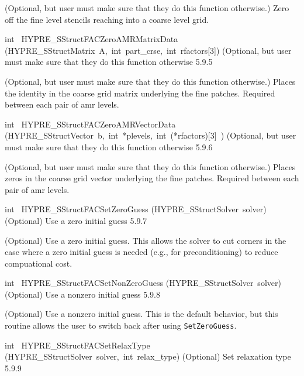 \documentclass{article}
\begin{document}
\begin{cxxentry}
\begin{cxxentry}
\begin{cxxfunction}
\begin{cxxdoc}
(Optional, but user must make sure that they do this function otherwise.)
Zero off the fine level stencils reaching into a coarse level grid.
\end{cxxdoc}
\end{cxxfunction}
\begin{cxxfunction}
{int\ }
        {HYPRE\_SStructFACZeroAMRMatrixData}
        {(HYPRE\_SStructMatrix\ A,\ int\ part\_crse,\ int\ rfactors[3])}
        {
(Optional, but user must make sure that they do this function otherwise}
        {5.9.5}
\begin{cxxdoc}

(Optional, but user must make sure that they do this function otherwise.)
Places the identity in the coarse grid matrix underlying the fine patches.
Required between each pair of amr levels.
\end{cxxdoc}
\end{cxxfunction}
\begin{cxxfunction}
{int\ }
        {HYPRE\_SStructFACZeroAMRVectorData}
        {(HYPRE\_SStructVector\ b,\ int\ *plevels,\ int\ (*rfactors)[3]\ )}
        {
(Optional, but user must make sure that they do this function otherwise}
        {5.9.6}
\begin{cxxdoc}

(Optional, but user must make sure that they do this function otherwise.)
Places zeros in the coarse grid vector underlying the fine patches.
Required between each pair of amr levels.
\end{cxxdoc}
\end{cxxfunction}
\begin{cxxfunction}
{int\ }
        {HYPRE\_SStructFACSetZeroGuess}
        {(HYPRE\_SStructSolver\ solver)}
        {
(Optional) Use a zero initial guess}
        {5.9.7}
\begin{cxxdoc}

(Optional) Use a zero initial guess.  This allows the solver to cut corners
in the case where a zero initial guess is needed (e.g., for preconditioning)
to reduce compuational cost.
\end{cxxdoc}
\end{cxxfunction}
\begin{cxxfunction}
{int\ }
        {HYPRE\_SStructFACSetNonZeroGuess}
        {(HYPRE\_SStructSolver\ solver)}
        {
(Optional) Use a nonzero initial guess}
        {5.9.8}
\begin{cxxdoc}

(Optional) Use a nonzero initial guess.  This is the default behavior, but
this routine allows the user to switch back after using {\tt SetZeroGuess}.
\end{cxxdoc}
\end{cxxfunction}
\begin{cxxfunction}
{int\ }
        {HYPRE\_SStructFACSetRelaxType}
        {(HYPRE\_SStructSolver\ solver,\ int\ relax\_type)}
        {
(Optional) Set relaxation type}
        {5.9.9}
\begin{cxxdoc}


\end{cxxdoc}
\end{cxxfunction}
\end{cxxentry}
\end{cxxentry}
\end{document}
